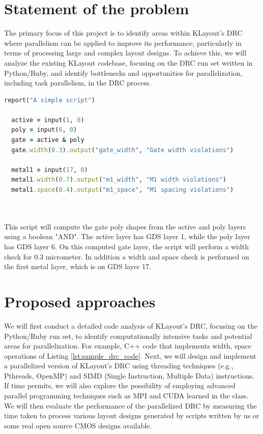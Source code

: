 \documentclass[sigconf]{acmart}
\begin{document}
\section{Statement of the problem}
The primary focus of this project is to identify areas within KLayout's DRC where parallelism can be applied to improve its performance, particularly in terms of processing large and complex layout designs. To achieve this, we will analyze the existing KLayout codebase, focusing on the DRC run set written in Python/Ruby, and identify bottlenecks and opportunities for parallelization, including task parallelism, in the DRC process.


\begin{lstlisting}[language=Ruby, caption=Sample DRC code in KLayout, label=lst:sample_drc_code]
  report("A simple script")

  active = input(1, 0)
  poly = input(6, 0)
  gate = active & poly
  gate.width(0.3).output("gate_width", "Gate width violations")
  
  metal1 = input(17, 0)
  metal1.width(0.7).output("m1_width", "M1 width violations")
  metal1.space(0.4).output("m1_space", "M1 spacing violations")
  
  
\end{lstlisting}
This script will compute the gate poly shapes from the active and poly layers using a boolean "AND". The active layer has GDS layer 1, while the poly layer has GDS layer 6. On this computed gate layer, the script will perform a width check for 0.3 micrometer. In addition a width and space check is performed on the first metal layer, which is on GDS layer 17. 


\section{Proposed approaches}
We will first conduct a detailed code analysis of KLayout's DRC, focusing on the Python/Ruby run set, to identify computationally intensive tasks and potential areas for parallelization. 
For example, C++ code that implements width, space operations of Listing \ref{lst:sample_drc_code}.  Next, we will design and implement a parallelized version of KLayout's DRC using threading techniques (e.g., Pthreads, OpenMP) and SIMD (Single Instruction, Multiple Data) instructions. If time permits, we will also explore the possibility of employing advanced parallel programming techniques such as MPI and CUDA learned in the class. We will then evaluate the performance of the parallelized DRC by measuring the time taken to process various layout designs generated by scripts written by us or some real open source CMOS designs available. 
\end{document}
